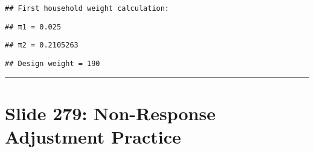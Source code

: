 \documentclass[
]{article}
\newenvironment{Shaded}{\begin{snugshade}}{\end{snugshade}}
\newcommand{\DecValTok}[1]{\textcolor[rgb]{0.00,0.00,0.81}{#1}}
\newcommand{\FunctionTok}[1]{\textcolor[rgb]{0.13,0.29,0.53}{\textbf{#1}}}
\newcommand{\NormalTok}[1]{#1}
\newcommand{\SpecialCharTok}[1]{\textcolor[rgb]{0.81,0.36,0.00}{\textbf{#1}}}
\newcommand{\StringTok}[1]{\textcolor[rgb]{0.31,0.60,0.02}{#1}}
\begin{document}
\begin{verbatim}
## First household weight calculation:
\end{verbatim}

\begin{Shaded}
\end{Shaded}

\begin{verbatim}
## π1 = 0.025
\end{verbatim}

\begin{Shaded}
\end{Shaded}

\begin{verbatim}
## π2 = 0.2105263
\end{verbatim}

\begin{Shaded}
\end{Shaded}

\begin{verbatim}
## Design weight = 190
\end{verbatim}

\begin{center}\rule{0.5\linewidth}{0.5pt}\end{center}

\section{Slide 279: Non-Response Adjustment
Practice}\label{slide-279-non-response-adjustment-practice}
\end{document}
